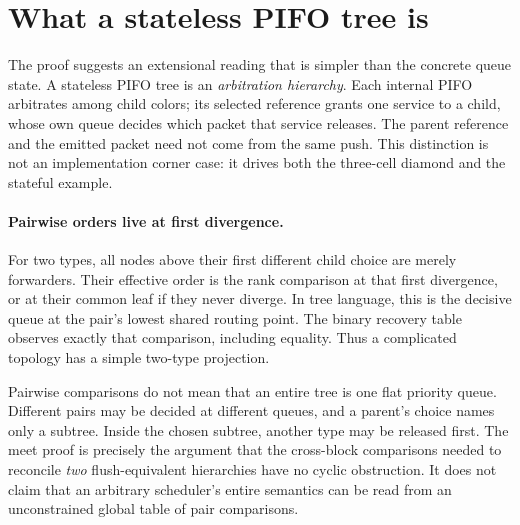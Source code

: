 \section{What a stateless PIFO tree is}
\label{sec:discussion}

The proof suggests an extensional reading that is simpler than the concrete
queue state.  A stateless PIFO tree is an \emph{arbitration hierarchy}.  Each
internal PIFO arbitrates among child colors; its selected reference grants one
service to a child, whose own queue decides which packet that service releases.
The parent reference and the emitted packet need not come from the same push.
This distinction is not an implementation corner case: it drives both the
three-cell diamond and the stateful example.

\paragraph{Pairwise orders live at first divergence.}
For two types, all nodes above their first different child choice are merely
forwarders.  Their effective order is the rank comparison at that first
divergence, or at their common leaf if they never diverge.  In tree language,
this is the decisive queue at the pair's lowest shared routing point.  The
binary recovery table observes exactly that comparison, including equality.
Thus a complicated topology has a simple two-type projection.

Pairwise comparisons do not mean that an entire tree is one flat priority
queue.  Different pairs may be decided at different queues, and a parent's
choice names only a subtree.  Inside the chosen subtree, another type may be
released first.  The meet proof is precisely the argument that the
cross-block comparisons needed to reconcile \emph{two} flush-equivalent
hierarchies have no cyclic obstruction.  It does not claim that an arbitrary
scheduler's entire semantics can be read from an unconstrained global table of
pair comparisons.


